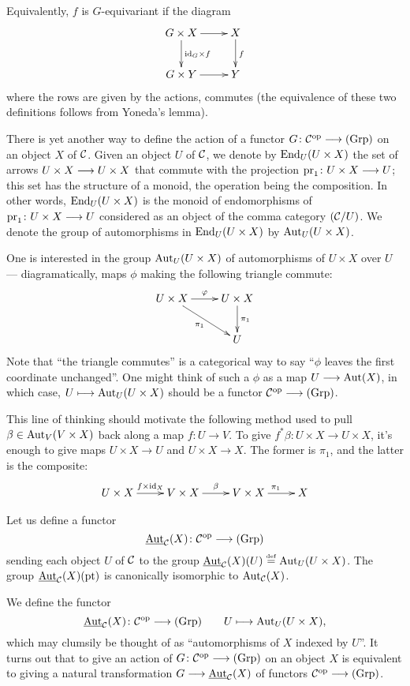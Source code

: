 \begin{2   CONTRAVARIANT FUNCTORS}
\begin{2.2 Group objects}
Equivalently, $f$ is $G$-equivariant if the diagram
   \[
   \xymatrix{
   G \times X \ar[r] \ar[d]^{\id_G \times f}
   &
   X \ar[d]^f\\
   G \times Y \ar[r]&
   Y\\
   }
   \]
where the rows are given by the actions, commutes (the equivalence of these two definitions follows from Yoneda's lemma).

There is yet another way to define the action of a functor $G \colon \cC\op \arr \catgrp$ on an object $X$ of $\mathcal{C}$. Given an object $U$ of $\mathcal{C}$, we denote by $\operatorname{End}_U(U \times X)$ the set of arrows $U \times X \arr U \times X$ that commute with the projection $\pr_1 \colon U \times X \arr U$; this set has the structure of a monoid, the operation being the composition. In other words, $\operatorname{End}_U(U \times X)$ is the monoid of endomorphisms of  $\pr_1 \colon U \times X \arr U$ considered as an object of the comma category $(\mathcal{C}/U)$. We denote the group of automorphisms in $\operatorname{End}_U(U \times X)$ by $\operatorname{Aut}_U(U \times X)$.
\begin{shaded}
One is interested in the group $\operatorname{Aut}_U(U \times X)$ of automorphisms of $U\times X$ over $U$ --- diagramatically, maps $\phi$ making the following triangle commute:
\[\xymatrix{
\ar[dr]_{\pi_1}U\times X\ar[r]^\phi&U\times X\ar[d]^{\pi_1}\\
&U
}\]
Note that ``the triangle commutes'' is a categorical way to say ``$\phi$ leaves the first coordinate unchanged''. One might think of such a $\phi$ as a map $U\longrightarrow\operatorname{Aut}(X)$, in which case, $U\longmapsto \operatorname{Aut}_U(U \times X)$ should be a functor $\mathcal{C}^{\mathrm{op}}\longrightarrow(\mathrm{Grp})$.

This line of thinking should motivate the following method used to pull $\beta\in\operatorname{Aut}_V(V \times X)$ back along a map $f:U\to V$. To give $f^*\beta:U\times X\to U\times X$, it's enough to give maps $U\times X\to U$ and $U\times X\to X$. The former is $\pi_1$, and the latter is the composite:
\[\xymatrix{
U\times X\ar[r]^{f\times\id_X}&
V\times X\ar[r]^{\beta}&
V\times X\ar[r]^{\pi_1}&X
}\]

\end{shaded}


Let us define a functor
   \[
   \underaut_{\cC}(X) \colon \cC\op \arr \catgrp
   \]
sending each object $U$ of $\mathcal{C}$ to the group $\mathop{\underline{\mathrm{Aut}}}\nolimits_{\mathcal{C}}(X)(U) \overset{\mathrm{\scriptscriptstyle def}} = \operatorname{Aut}_U(U \times X)$. The group $\mathop{\underline{\mathrm{Aut}}}\nolimits_{\mathcal{C}}(X)(\mathrm{pt})$ is canonically isomorphic to $\operatorname{Aut}_{\mathcal{C}}(X)$.
\begin{shaded}
We define the functor
   \[
   \underaut_{\cC}(X) \colon \cC\op \arr \catgrp\qquad U\mapsto \aut_U(U \times X),
   \]
which may clumsily be thought of as ``automorphisms of $X$ indexed by $U$''. It turns out that to give an action of $G \colon \cC\op \arr \catgrp$ on an object $X$ is equivalent to giving a natural transformation $G \arr \underaut_{\cC}(X)$ of functors $\cC\op \arr \catgrp$.
\end{shaded}


\end{2.2 Group objects}
\end{2   CONTRAVARIANT FUNCTORS}
